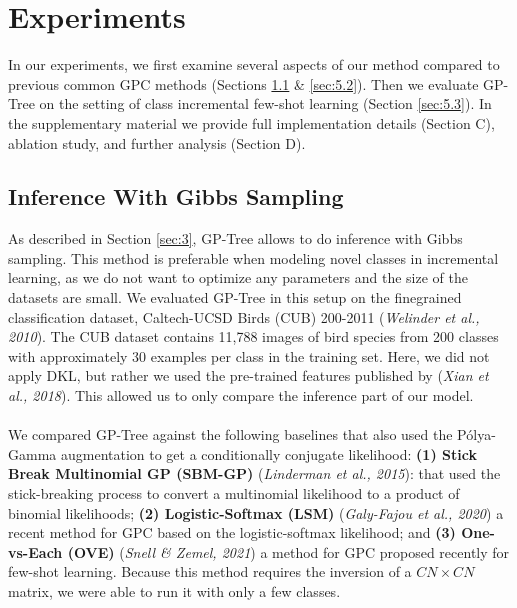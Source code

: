 \documentclass[preprint,11pt]{elsarticle}
\begin{document}
    \section{Experiments}
    \label{sec:5}
    In our experiments, we first examine several aspects of our
    method compared to previous common GPC methods (Sections
    \ref{sec:5.1} \& \ref{sec:5.2}). Then we evaluate GP-Tree on the setting of
    class incremental few-shot learning (Section \ref{sec:5.3}). In the supplementary
    material we provide full implementation details
    (Section C), ablation study, and further analysis (Section D).
        \subsection{Inference With Gibbs Sampling}
        \label{sec:5.1}
        As described in Section \ref{sec:3}, GP-Tree allows to do inference
        with Gibbs sampling. This method is preferable when modeling
        novel classes in incremental learning, as we do not
        want to optimize any parameters and the size of the datasets
        are small. We evaluated GP-Tree in this setup on the finegrained
        classification dataset, Caltech-UCSD Birds (CUB)
        200-2011 (\textit{Welinder et al., 2010}\cite{welinder2010caltech}). The CUB dataset contains
        11,788 images of bird species from 200 classes with approximately
        30 examples per class in the training set. Here,
        we did not apply DKL, but rather we used the pre-trained
        features published by (\textit{Xian et al., 2018}\cite{xian2018feature}). This allowed us to
        only compare the inference part of our model.
        \\
        \\
        We compared GP-Tree against the following baselines that
        also used the Pólya-Gamma augmentation to get a conditionally
        conjugate likelihood: \textbf{(1) Stick Break Multinomial
        GP (SBM-GP)} (\textit{Linderman et al., 2015}\cite{linderman2015dependent}): that used the
        stick-breaking process to convert a multinomial likelihood
        to a product of binomial likelihoods; \textbf{(2) Logistic-Softmax
        (LSM)} (\textit{Galy-Fajou et al., 2020}\cite{galy2020multiclass}) a recent method for GPC
        based on the logistic-softmax likelihood; and \textbf{(3) One-vs-Each (OVE)} (\textit{Snell \& Zemel, 2021}\cite{snell2021bayesian}) a method for GPC proposed
        recently for few-shot learning. Because this method
        requires the inversion of a $CN \times CN$ matrix, we were able to run it with only a few classes.
\end{document}
